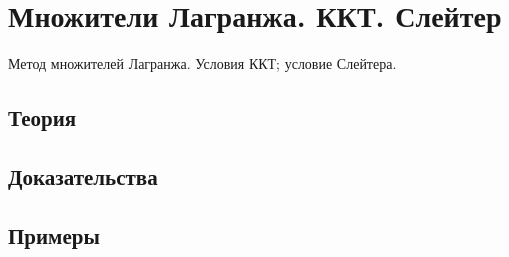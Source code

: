 
\section{Множители Лагранжа. ККТ. Слейтер}
\label{sec:2.4.16-lagrange-multipliers}

\begin{ticket}
Метод множителей Лагранжа. Условия ККТ; условие Слейтера.
\end{ticket}

\subsection*{Теория}

\subsection*{Доказательства}

\subsection*{Примеры}
